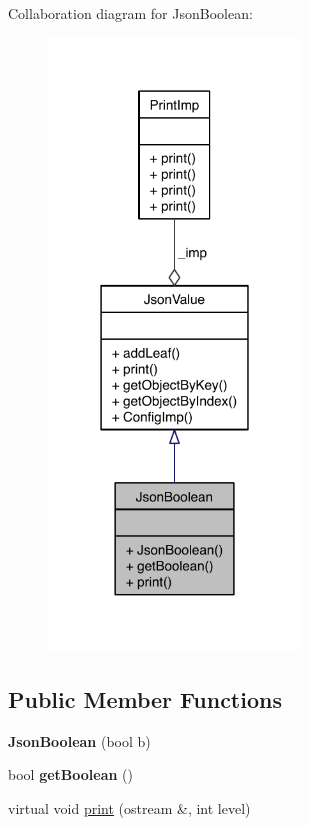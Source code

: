 Collaboration diagram for Json\-Boolean\-:
\nopagebreak
\begin{figure}[H]
\begin{center}
\leavevmode
\includegraphics[width=190pt]{class_json_boolean__coll__graph}
\end{center}
\end{figure}
\subsection*{Public Member Functions}
\begin{DoxyCompactItemize}
\item 
\hypertarget{class_json_boolean_acd2c55b733c9f50ff1e6d7f52fa50b31}{{\bfseries Json\-Boolean} (bool b)}\label{class_json_boolean_acd2c55b733c9f50ff1e6d7f52fa50b31}

\item 
\hypertarget{class_json_boolean_ab2015eb0c0029f8a80223a2c3f5106e1}{bool {\bfseries get\-Boolean} ()}\label{class_json_boolean_ab2015eb0c0029f8a80223a2c3f5106e1}

\item 
virtual void \hyperlink{class_json_boolean_a0070f85c41b82ab154897e4f63e8ee37}{print} (ostream \&, int level)
\end{DoxyCompactItemize}


